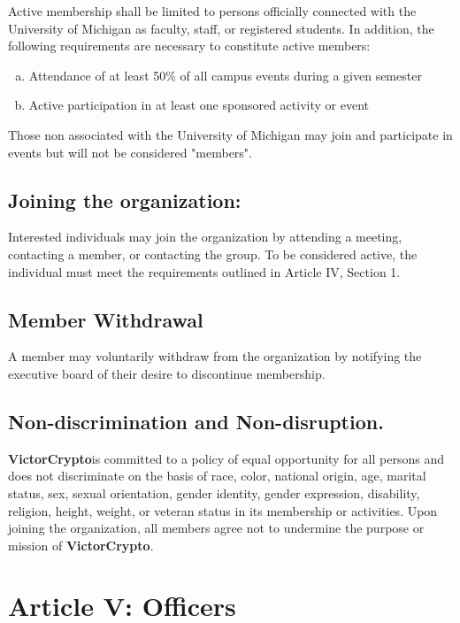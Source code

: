 \documentclass[11pt]{article}
\newcommand{\orgname}{\textbf{VictorCrypto}}
\begin{document}
    Active membership shall be limited to persons officially connected with the University of Michigan as faculty, staff, or registered students.
    In addition, the following requirements are necessary to constitute active members:

    \begin{enumerate}
        [a)]
        \item Attendance of at least 50\% of all campus events during a given semester
        \item Active participation in at least one sponsored activity or event
    \end{enumerate}

    Those non associated with the University of Michigan may join and participate in events but will not be considered "members".

    \subsection{Joining the organization:}

    Interested individuals may join the organization by attending a meeting, contacting a member, or contacting the
    group.
    To be considered active, the individual must meet the requirements outlined in Article IV, Section 1.

    \subsection{Member Withdrawal}

    A member may voluntarily withdraw from the organization by notifying the executive board of their desire to discontinue membership.

    \subsection{Non-discrimination and Non-disruption. }

    \orgname is committed to a policy of equal opportunity for all persons and does not discriminate on the basis of race, color, national origin, age, marital status, sex, sexual orientation, gender identity, gender expression, disability, religion, height, weight, or veteran status in its membership or activities.
    Upon joining the organization, all members agree not to undermine the purpose or mission of \orgname.


    \section{Article V: Officers}
\end{document}
